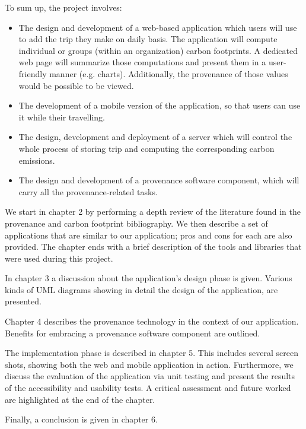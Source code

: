 To sum up, the project involves:
\begin{itemize}
  \item 
        The design and development of a web-based application which users will use to add the trip they make on daily basis. The application will compute individual or groups (within an organization) carbon footprints. A dedicated web page will summarize those computations and present them in a user-friendly manner (e.g. charts). Additionally, the provenance of those values would be possible to be viewed.
  \item 
        The development of a mobile version of the application, so that users can use it while their travelling.
  \item 
        The design, development and deployment of a server which will control the whole process of storing trip and computing the corresponding carbon emissions.
  \item The design and development of a provenance software component, which will carry all the provenance-related tasks.
        
\end{itemize}

We start in chapter 2 by performing a depth review of the literature found in the provenance and carbon footprint bibliography. We then describe a set of applications that are similar to our application; pros and cons for each are also provided. The chapter ends with a brief description of the tools and libraries that were used during this project.

In chapter 3 a discussion about the application's design phase is given. Various kinds of UML diagrams showing in detail the design of the application, are presented.

Chapter 4 describes the provenance technology in the context of our application. Benefits for embracing a provenance software component are outlined.

The implementation phase is described in chapter 5. This includes several screen shots, showing both the web and mobile application in action. Furthermore, we discuss the evaluation of the application via unit testing and present the results of the accessibility and usability tests. A critical assessment and future worked are highlighted at the end of the chapter.

Finally, a conclusion is given in chapter 6.


